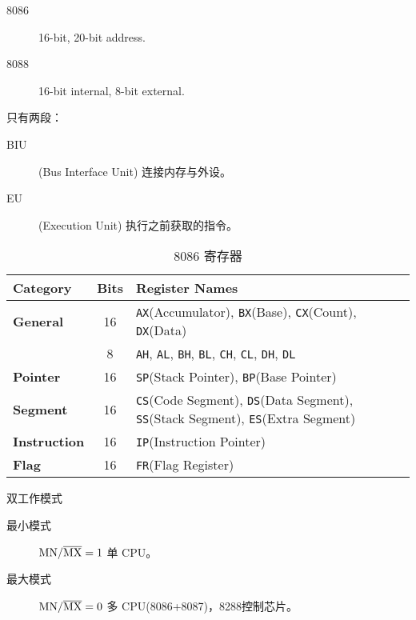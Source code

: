 
\begin{description}
\item[8086] 16-bit, 20-bit address.
\item[8088] 16-bit internal, 8-bit external.
\end{description}

只有两段：
\begin{description}
	\item[BIU](Bus Interface Unit) 连接内存与外设。
	\item[EU](Execution Unit) 执行之前获取的指令。
\end{description}

\begin{table*}
	\centering
	\caption{8086 寄存器}
	\begin{tabular}{|>{\bfseries}l|c|l|}
		\hline
		Category & \bfseries Bits &\bfseries Register Names \\
		\hline
		General & 16 & \texttt{AX}(Accumulator), \texttt{BX}(Base), \texttt{CX}(Count), \texttt{DX}(Data) \\
		\hline
		& 8 & \texttt{AH}, \texttt{AL}, \texttt{BH}, \texttt{BL}, \texttt{CH}, \texttt{CL}, \texttt{DH}, \texttt{DL} \\
		\hline
		Pointer & 16 & \texttt{SP}(Stack Pointer), \texttt{BP}(Base Pointer) \\
		\hline
		Segment & 16 & \texttt{CS}(Code Segment), \texttt{DS}(Data Segment), \texttt{SS}(Stack Segment), \texttt{ES}(Extra Segment) \\
		\hline
		Instruction & 16 & \texttt{IP}(Instruction Pointer) \\
		\hline
		Flag & 16 & \texttt{FR}(Flag Register) \\
		\hline
	\end{tabular}
\end{table*}

双工作模式
\begin{description}
	\item[最小模式] $\rm MN/\overline{MX}=1$ 单 CPU。
	\item[最大模式] $\rm MN/\overline{MX}=0$ 多 CPU(8086+8087)，8288控制芯片。 
\end{description}

